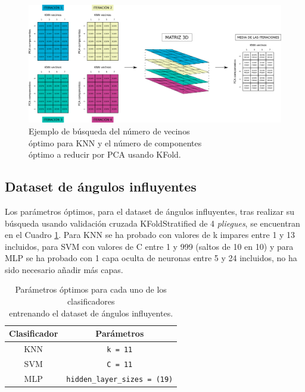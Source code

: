 \begin{figure} [h!]
  \begin{center}
    \includegraphics[width=16cm]{figs/KFold_KNN_PCA.png}
  \end{center}
  \captionsetup{justification=centering}
  \caption{Ejemplo de búsqueda del número de vecinos\\
  óptimo para KNN y el número de componentes\\
  óptimo a reducir por PCA usando KFold.}
  \label{fig:kfold_KNN_PCA}
\end{figure}

\subsection{Dataset de ángulos influyentes}

Los parámetros óptimos, para el dataset de ángulos influyentes, tras realizar su búsqueda usando validación cruzada KFoldStratified de 4 \textit{pliegues}, se encuentran en el Cuadro \ref{cuadro:parametros_dataset1}. Para KNN se ha probado con valores de k impares entre 1 y 13 incluidos, para SVM con valores de C entre 1 y 999 (saltos de 10 en 10) y para MLP se ha probado con 1 capa oculta de neuronas entre 5 y 24 incluidos, no ha sido necesario añadir más capas.\\

\begin{table}[H]
\begin{center}
\begin{tabular}{|c|c|}
     \hline
    \textbf{Clasificador} & \textbf{Parámetros} \\
    \hline
     KNN & \verb|k = 11| \\
     SVM & \verb|C = 11| \\
     MLP & \verb|hidden_layer_sizes = (19)|\\
     \hline
 \end{tabular}
 \captionsetup{justification=centering}
\caption{Parámetros óptimos para cada uno de los clasificadores\\
entrenando el dataset de ángulos influyentes.}
\label{cuadro:parametros_dataset1}
\end{center}
\end{table}

